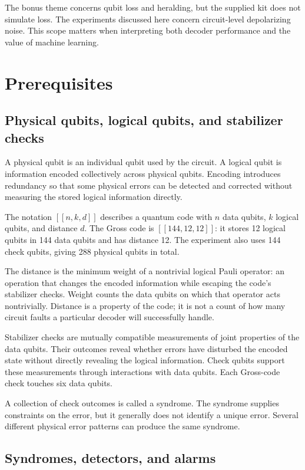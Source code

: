 The bonus theme concerns qubit loss and heralding, but the supplied kit does not simulate loss. The experiments discussed here concern circuit-level depolarizing noise. This scope matters when interpreting both decoder performance and the value of machine learning.

\section{Prerequisites}

\subsection{Physical qubits, logical qubits, and stabilizer checks}

A physical qubit is an individual qubit used by the circuit. A logical qubit is information encoded collectively across physical qubits. Encoding introduces redundancy so that some physical errors can be detected and corrected without measuring the stored logical information directly.

The notation $[[n,k,d]]$ describes a quantum code with $n$ data qubits, $k$ logical qubits, and distance $d$. The Gross code is $[[144,12,12]]$: it stores 12 logical qubits in 144 data qubits and has distance 12. The experiment also uses 144 check qubits, giving 288 physical qubits in total.

The distance is the minimum weight of a nontrivial logical Pauli operator: an operation that changes the encoded information while escaping the code's stabilizer checks. Weight counts the data qubits on which that operator acts nontrivially. Distance is a property of the code; it is not a count of how many circuit faults a particular decoder will successfully handle.

Stabilizer checks are mutually compatible measurements of joint properties of the data qubits. Their outcomes reveal whether errors have disturbed the encoded state without directly revealing the logical information. Check qubits support these measurements through interactions with data qubits. Each Gross-code check touches six data qubits.

A collection of check outcomes is called a syndrome. The syndrome supplies constraints on the error, but it generally does not identify a unique error. Several different physical error patterns can produce the same syndrome.

\subsection{Syndromes, detectors, and alarms}

